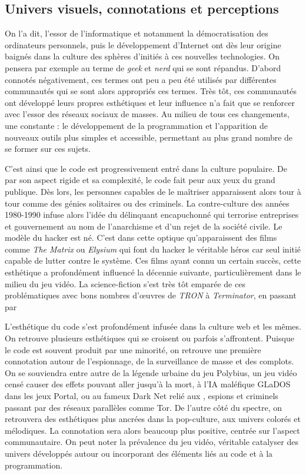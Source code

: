 \documentclass[12pt]{article} %
\begin{document}
\subsection{Univers visuels, connotations et perceptions}
On l'a dit, l'essor de l'informatique et notamment la démocratisation des ordinateurs personnels, puis le développement d'Internet ont dès leur origine baignés dans la culture des sphères d'initiés à ces nouvelles technologies. On pensera par exemple au terme de \textit{geek} et \textit{nerd} qui se sont répandus. D'abord connotés négativement, ces termes ont peu a peu été utilisés par différentes communautés qui se sont alors appropriés ces termes. Très tôt, ces communautés ont développé leurs propres esthétiques et leur influence n'a fait que se renforcer avec l'essor des réseaux sociaux de masses. Au milieu de tous ces changements, une constante : le développement de la programmation et l'apparition de nouveaux outils plus simples et accessible, permettant au plus grand nombre de se former sur ces sujets.

C'est ainsi que le code est progressivement entré dans la culture populaire. De par son aspect rigide et sa complexité, le code fait peur aux yeux du grand publique. Dès lors, les personnes capables de le maîtriser apparaissent alors tour à tour comme des génies solitaires ou des criminels. La contre-culture des années 1980-1990 infuse alors l'idée du délinquant encapuchonné qui terrorise entreprises et gouvernement au nom de l'anarchisme et d'un rejet de la société civile. Le modèle du hacker est né. C'est dans cette optique qu'apparaissent des films comme \textit{The Matrix} ou \textit{Elysium} qui font du hacker le véritable héros car seul initié capable de lutter contre le système. Ces films ayant connu un certain succès, cette esthétique a profondément influencé la décennie suivante, particulièrement dans le milieu du jeu vidéo. La science-fiction s'est très tôt emparée de ces problématiques avec bons nombres d'œuvres de \textit{TRON} à \textit{Terminator}, en passant par 

L'esthétique du code s'est profondément infusée dans la culture web et les mêmes. On retrouve plusieurs esthétiques qui se croisent ou parfois s'affrontent. Puisque le code est souvent produit par une minorité, on retrouve une première connotation autour de l'espionnage, de la surveillance de masse et des complots. On se souviendra entre autre de la légende urbaine du jeu Polybius, un jeu vidéo censé causer des effets pouvant aller jusqu'à la mort, à l'IA maléfique GLaDOS dans les jeux Portal, ou au fameux Dark Net relié aux , espions et criminels passant par des réseaux parallèles comme Tor. De l'autre côté du spectre, on retrouvera des esthétiques plus ancrées dans la pop-culture, aux univers colorés et mélodiques. La connotation sera alors beaucoup plus positive, centrée sur l'aspect communautaire. On peut noter la prévalence du jeu vidéo, véritable catalyser des univers développés autour ou incorporant des éléments liés au code et à la programmation.
\end{document}
